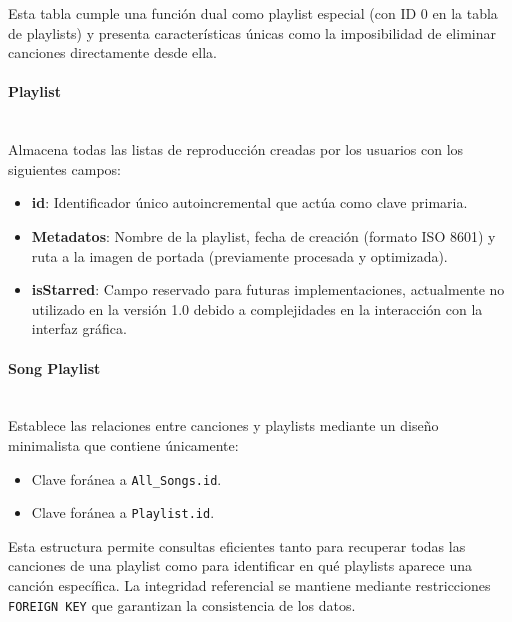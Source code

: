 \documentclass[11pt, a4paper]{article}
\begin{document}
              Esta tabla cumple una función dual como playlist especial (con ID 0 en la tabla de playlists) y presenta características únicas como la imposibilidad de eliminar canciones directamente desde ella.

              \paragraph{Playlist}
              ‎ \\

              Almacena todas las listas de reproducción creadas por los usuarios con los siguientes campos:

              \begin{itemize}
                \item \textbf{id}: Identificador único autoincremental que actúa como clave primaria.
                \item \textbf{Metadatos}: Nombre de la playlist, fecha de creación (formato ISO 8601) y ruta a la imagen de portada (previamente procesada y optimizada).
                \item \textbf{isStarred}: Campo reservado para futuras implementaciones, actualmente no utilizado en la versión 1.0 debido a complejidades en la interacción con la interfaz gráfica.
              \end{itemize}

              \paragraph{Song Playlist}
              ‎ \\

              Establece las relaciones entre canciones y playlists mediante un diseño minimalista que contiene únicamente:

              \begin{itemize}
                \item Clave foránea a \texttt{All\_Songs.id}.
                \item Clave foránea a \texttt{Playlist.id}.
              \end{itemize}

              Esta estructura permite consultas eficientes tanto para recuperar todas las canciones de una playlist como para identificar en qué playlists aparece una canción específica. La integridad referencial se mantiene mediante restricciones \texttt{FOREIGN KEY} que garantizan la consistencia de los datos.
\end{document}
